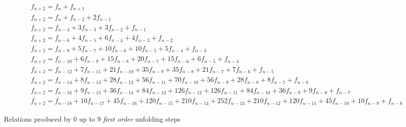 \begin{sidewaystable}

    \begin{eqnarray}
        & f_{n + 2} = f_{n} + f_{n + 1} \\
        & f_{n + 2} = f_{n} + f_{n - 2} + 2 f_{n - 1}\\
        & f_{n + 2} = f_{n - 4} + 3 f_{n - 3} + 3 f_{n - 2} + f_{n - 1}\\
        & f_{n + 2} = f_{n - 6} + 4 f_{n - 5} + 6 f_{n - 4} + 4 f_{n - 3} + f_{n - 2}\\
        & f_{n + 2} = f_{n - 8} + 5 f_{n - 7} + 10 f_{n - 6} + 10 f_{n - 5} + 5 f_{n - 4} + f_{n - 3}\\
        & f_{n + 2} = f_{n - 10} + 6 f_{n - 9} + 15 f_{n - 8} + 20 f_{n - 7} + 15 f_{n - 6} + 6 f_{n - 5} + f_{n - 4}\\
        & f_{n + 2} = f_{n - 12} + 7 f_{n - 11} + 21 f_{n - 10} + 35 f_{n - 9} + 35 f_{n - 8} + 21 f_{n - 7} + 7 f_{n - 6} + f_{n - 5}\\
        & f_{n + 2} = f_{n - 14} + 8 f_{n - 13} + 28 f_{n - 12} + 56 f_{n - 11} + 70 f_{n - 10} + 56 f_{n - 9} + 28 f_{n - 8} + 8 f_{n - 7} + f_{n - 6}\\
        & f_{n + 2} = f_{n - 16} + 9 f_{n - 15} + 36 f_{n - 14} + 84 f_{n - 13} + 126 f_{n - 12} + 126 f_{n - 11} + 84 f_{n - 10} + 36 f_{n - 9} + 9 f_{n - 8} + f_{n - 7}\\
        & f_{n + 2} = f_{n - 18} + 10 f_{n - 17} + 45 f_{n - 16} + 120 f_{n - 15} + 210 f_{n - 14} + 252 f_{n - 13} + 210 f_{n - 12} + 120 f_{n - 11} + 45 f_{n - 10} + 10 f_{n - 9} + f_{n - 8}
        \end{eqnarray}

    \caption{Relations produced by $0$ up to $9$ \emph{first order} unfolding steps}
    \label{triangle:fib:first:order}
\end{sidewaystable}

